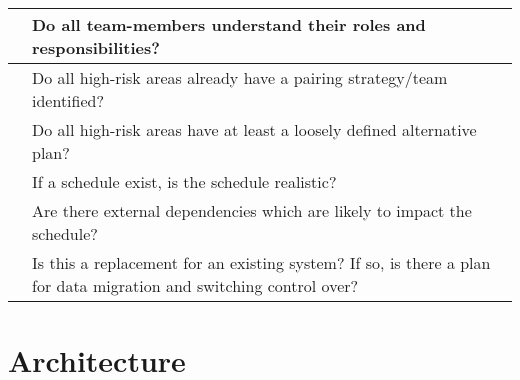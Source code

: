 \documentclass{article}
\begin{document}
\begin{center}
\begin{tabular}{ | p{.25cm} || p{10cm} |}
     & Do all team-members understand their roles and responsibilities? \\ \hline
     & Do all high-risk areas already have a pairing strategy/team identified? \\ \hline
     & Do all high-risk areas have at least a loosely defined alternative plan? \\ \hline
     & If a schedule exist, is the schedule realistic? \\ \hline
     & Are there external dependencies which are likely to impact the schedule? \\ \hline
     & Is this a replacement for an existing system? If so, is there a plan for data migration and switching control over? \\ \hline
    \end{tabular}
\end{center}



\section{Architecture}
\end{document}
